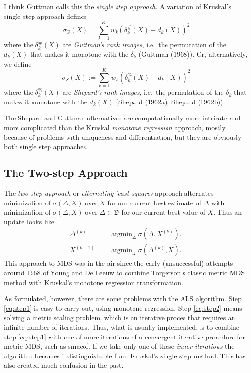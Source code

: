 \documentclass[
  12pt,
]{article}
\begin{document}
I think Guttman calls this the \emph{single step approach}. A variation of Kruskal's single-step approach defines
\[
\sigma_G(X)=\sum_{k=1}^Kw_k(\delta_k^\#(X)-d_k(X))^2
\]
where the \(\delta_k^\#(X)\) are \emph{Guttman's rank images}, i.e.~the permutation of the
\(d_k(X)\) that makes it monotone with the \(\delta_k\) (Guttman (1968)). Or, alternatively, we define
\[
\sigma_S(X):=\sum_{k=1}^Kw_k(\delta_k^\%(X)-d_k(X))^2
\]
where the \(\delta_k^\%(X)\) are \emph{Shepard's rank images}, i.e.~the permutation of
the \(\delta_k\) that makes it monotone with the \(d_k(X)\) (Shepard (1962a), Shepard (1962b)).

The Shepard and Guttman alternatives are computationally more intricate and more complicated
than the Kruskal \emph{monotone regression} approach, mostly because of problems with uniqueness and differentiation, but they are obviously both single step approaches.

\subsection{The Two-step Approach}\label{the-two-step-approach}

The \emph{two-step approach} or \emph{alternating least squares} approach alternates minimization
of \(\sigma(\Delta,X)\) over \(X\) for our current best estimate of \(\Delta\) with
minimization of \(\sigma(\Delta,X)\) over \(\Delta\in\mathfrak{D}\) for our current best
value of \(X\). Thus an update looks like
\begin{align}
\Delta^{(k)}&=\mathop{\text{argmin}}_\Delta\sigma(\Delta,X^{(k)}),\\
X^{(k+1)}&=\mathop{\text{argmin}}_X\sigma(\Delta^{(k)},X).
\end{align}
This approach to MDS was in the air since the early (unsuccessful) attempts around 1968 of Young and De Leeuw to combine Torgerson's classic metric MDS method with Kruskal's monotone regression transformation.

As formulated, however, there are some problems with the ALS algorithm.
Step \eqref{eq:step1} is easy to carry out, using monotone regression. Step \eqref{eq:step2} means solving a metric scaling problem,
which is an iterative proces that requires an infinite number of iterations. Thus, what is usually
implemented, is to combine step \eqref{eq:step1} with one of more iterations of a convergent iterative procedure
for metric MDS, such as smacof. If we take only one of these \emph{inner iterations} the algorithm
becomes indistinguishable from Kruskal's single step method. This has also created much confusion in the
past.
\end{document}
